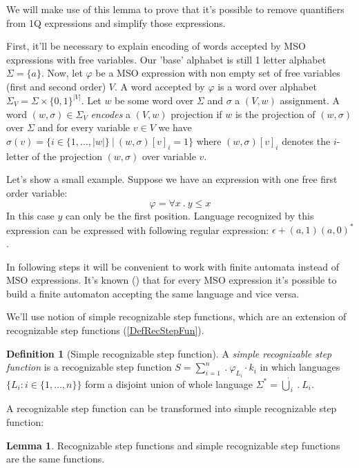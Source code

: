 \documentclass[12pt]{article}
\theoremstyle{definition}
\newtheorem{definition}{Definition}[section]
\newtheorem{lemma}[theorem]{Lemma}
\begin{document}
We will make use of this lemma to prove that it's possible to remove quantifiers from 1Q expressions and simplify those expressions. 

First, it'll be necessary to explain encoding of words accepted by MSO expressions with free variables. Our 'base' alphabet is still 1 letter alphabet $\Sigma = \{a\}$. Now, let $\varphi$ be a MSO expression with non empty set of free variables (first and second order) $V$. A word accepted by $\varphi$ is a word over alphabet $\Sigma_V = \Sigma \times \{0, 1\}^{|V|}$. Let $w$ be some word over $\Sigma$ and $\sigma$ a $(V, w)$ assignment. A word $(w, \sigma) \in \Sigma_V$ \textit{encodes} a $(V, w)$ projection if $w$ is the projection of $(w, \sigma)$ over $\Sigma$ and for every variable $v \in V$ we have $\sigma(v) = \{i \in \{1,\ldots,|w|\} \ | \ (w, \sigma)[v]_i = 1 \}$ where $(w, \sigma)[v]_i$ denotes the $i$-letter of the projection $(w, \sigma)$ over variable $v$.

Let's show a small example. Suppose we have an expression with one free first order variable:
$$\varphi = \forall x \ . \ y \leq x$$
In this case $y$ can only be the first position. Language recognized by this expression can be expressed with following regular expression: $\epsilon + (a,1)(a,0)^*$.

In following steps it will be convenient to work with finite automata instead of MSO expressions. It's known (\cite{Buchi1960}) that for every MSO expression it's possible to build a finite automaton accepting the same language and vice versa.

We'll use notion of simple recognizable step functions, which are an extension of recognizable step functions (\ref{DefRecStepFun}).

\begin{definition}[Simple recognizable step function]
    \label{DefSimpleRecStepFun}
    A \textit{simple recognizable step function} is a recognizable step function $S = \sum_{i = 1}^{n} \ . \ \varphi_{L_i} \cdot k_i$ in which languages $\{L_i : i \in \{1,\ldots,n\}\}$ form a disjoint union of whole language $\Sigma^* = \dot{\bigcup}_i \ . \ L_i$.
\end{definition}

A recognizable step function can be transformed into simple recognizable step function:

\begin{lemma}
    \label{RecEqSimpleRec}
    Recognizable step functions and simple recognizable step functions are the same functions.
\end{lemma}
\end{document}
